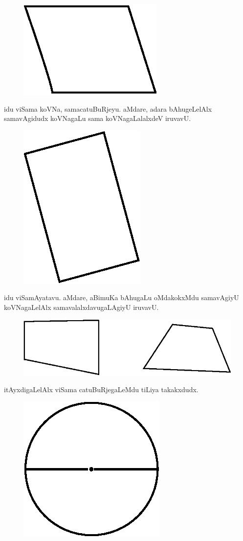 \begin{figure}[H]
\centering
\includegraphics[scale=.8]{figure/fig9.eps}
\end{figure}
idu viSama koVNa, samacatuBuRjeyu. aMdare, adara bAhugeLelAlx
samavAgidudx koVNagaLu sama koVNagaLalalxdeV iruvavU.
\begin{figure}[H]
\centering
\includegraphics[scale=.8]{figure/fig10.eps}
\end{figure}
idu viSamAyatavu. aMdare, aBimuKa bAhugaLu oMdakokxMdu samavAgiyU
koVNagaLelAlx samavalalxdavugaLAgiyU iruvavU.
\begin{figure}[H]
\centering
\includegraphics[scale=.8]{figure/fig11.eps}
\end{figure}
itAyxdigaLelAlx viSama catuBuRjegaLeMdu tiLiya takakxdudx.
\begin{figure}[H]
\centering
\includegraphics[scale=.8]{figure/fig12.eps}
\end{figure}
